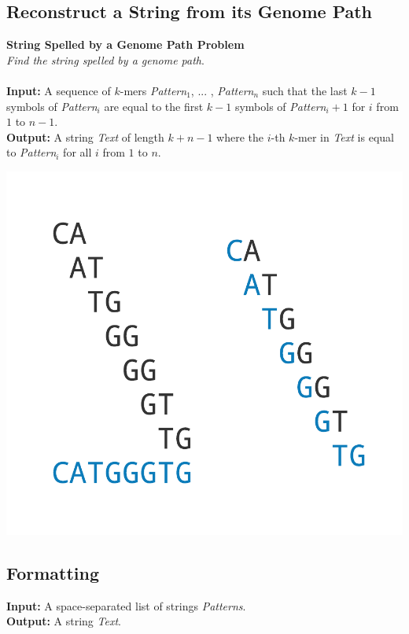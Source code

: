 \documentclass{article}
\begin{document}
\subsection{Reconstruct a String from its Genome Path}
\hline\vspace{5}
\textbf{String Spelled by a Genome Path Problem}\\
\emph{Find the string spelled by a genome path}.\\ \\
\textbf{Input:} A sequence of $k$-mers \emph{Pattern}$_1$, ... , \emph{Pattern}$_n$ such that the last $k-1$ symbols of \emph{Pattern}$_i$ are equal to the first $k-1$ symbols of \emph{Pattern}$_i+1$ for $i$ from $1$ to $n-1$.\\
\textbf{Output:} A string \emph{Text} of length $k+n-1$ where the $i$-th $k$-mer in \emph{Text} is equal to \emph{Pattern}$_i$ for all $i$ from $1$ to $n$.
\begin{center}
    \includegraphics[scale=0.24]{c3/logos/3B.png}
\end{center}
\hline\vspace{5}

\subsection*{Formatting}
\noindent\textbf{Input:} A space-separated list of strings \emph{Patterns}.\\
\noindent\textbf{Output:} A string \emph{Text}.
\end{document}
